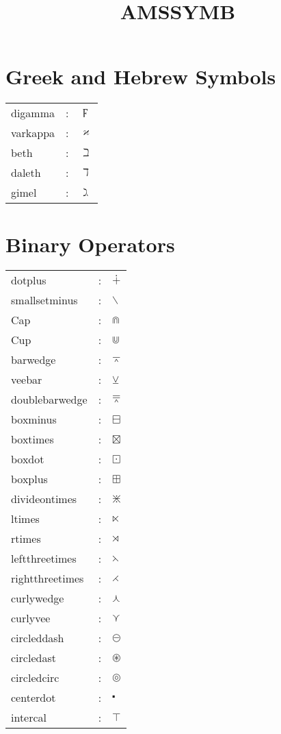 \documentclass{article}
\title{AMSSYMB}
\begin{document}
\maketitle
\section{Greek and Hebrew Symbols}
\begin{tabular}{lll}
digamma & : & $\digamma$\\
varkappa & : & $\varkappa$\\
beth & : & $\beth$\\
daleth & : & $\daleth$\\ 
gimel & : & $\gimel$
\end{tabular}
\section{Binary Operators} 
\begin{tabular}{lll} 
dotplus & : & $\dotplus$\\
smallsetminus & : & $\smallsetminus$\\
Cap & : & $\Cap$\\
Cup & : & $\Cup$\\
barwedge & : & $\barwedge$\\
veebar & : & $\veebar$\\
doublebarwedge & : & $\doublebarwedge$\\
boxminus & : & $\boxminus$\\
boxtimes & : & $\boxtimes$\\
boxdot & : & $\boxdot$\\
boxplus & : & $\boxplus$\\
divideontimes & : & $\divideontimes$\\
ltimes & : & $\ltimes$\\
rtimes & : & $\rtimes$\\
leftthreetimes & : & $\leftthreetimes$\\
rightthreetimes & : & $\rightthreetimes$\\
curlywedge & : & $\curlywedge$\\
curlyvee & : & $\curlyvee$\\
circleddash & : & $\circleddash$\\
circledast & : & $\circledast$\\
circledcirc & : & $\circledcirc$\\
centerdot & : & $\centerdot$\\
intercal & : & $\intercal$
\end{tabular}
\end{document}
